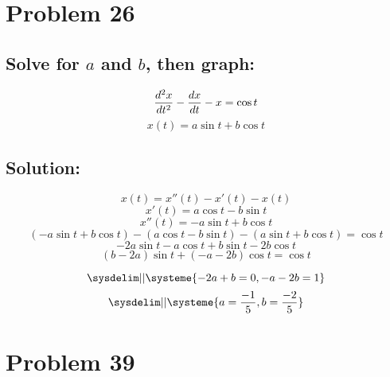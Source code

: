 \documentclass{article}
\begin{document}
\pagebreak
\section*{Problem 26}
\subsection*{Solve for $a$ and $b$, then graph: }
\begin{equation*}
    \frac{d^2 x}{dt^2} - \frac{dx}{dt} - x = \cos{t}\\
\end{equation*}
\begin{equation*}
    x(t) = a \sin{t} + b \cos{t}
\end{equation*}
\subsection*{Solution:}
$$ x(t) = x''(t) - x'(t) - x(t)$$
$$x'(t) = a \cos{t} - b \sin{t}$$
$$x''(t) = - a \sin{t} + b \cos{t}$$
$$ (- a \sin{t} + b \cos{t}) - (a \cos{t} - b \sin{t}) - (a \sin{t} + b \cos{t}) = \cos{t}$$
$$-2a\sin{t} - a\cos{t} + b\sin{t} - 2b\cos{t}$$
$$(b-2a)\sin{t} + (-a-2b)\cos{t} = \cos{t}$$

\begin{equation*}
\sysdelim||\systeme{
    -2a + b = 0,
    -a - 2b = 1
}
\end{equation*}
\begin{equation*}
\sysdelim||\systeme{
    a = \frac{-1}{5},
    b = \frac{-2}{5}
}
\end{equation*}
\noindent\makebox[\linewidth]{\rule{16cm}{0.4pt}}
\section*{Problem 39}
\end{document}
